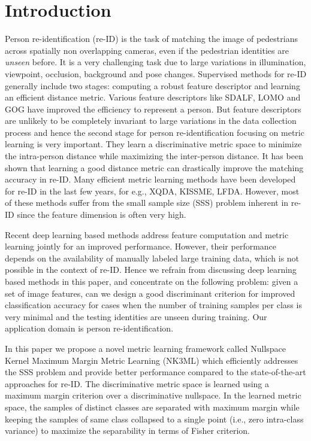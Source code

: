 \documentclass[runningheads]{llncs}
\begin{document}
\section{Introduction}
Person re-identification (re-ID) is the task of matching the image of pedestrians across spatially \color{black}non overlapping cameras, even if the pedestrian identities  are \textit{unseen} before. It is a very challenging task due to large variations in illumination, viewpoint, occlusion, background and pose changes. Supervised methods for re-ID generally include two stages: computing a robust feature descriptor and learning an efficient distance metric. Various feature descriptors like SDALF\cite{SDALF}, LOMO\cite{LOMO} and GOG\cite{GOG} have improved the efficiency to represent a person. But feature descriptors are unlikely to be completely invariant to large variations in the data collection process and hence the second stage for person re-identification focusing on metric learning is very important. They learn a discriminative metric space to minimize the intra-person distance while maximizing the inter-person distance. It has been shown that learning a good distance metric can drastically improve the matching accuracy in re-ID. Many efficient metric learning methods have been developed for re-ID in the last few years, for e.g., XQDA\cite{LOMO}, KISSME\cite{KISSME},  LFDA\cite{LFDA:CVPR}. However, most of these methods suffer from the small sample size (SSS) problem inherent in re-ID since the feature dimension is often very high.


Recent deep learning based methods address feature computation and metric learning jointly for an improved performance. However, their performance depends on the availability of manually labeled large training data, which is not possible in the context of re-ID. Hence we refrain from discussing deep learning based methods in this paper, and concentrate on the following problem: given a set of image features, can we design a good discriminant criterion for improved classification accuracy for cases when the number of training samples per class is very minimal and the testing identities are unseen during training. \color{black}Our application domain is person re-identification.

In this paper we propose a  novel metric learning framework called Nullspace Kernel Maximum Margin Metric Learning (NK3ML) which efficiently addresses the SSS problem and provide better performance compared to the state-of-the-art approaches for re-ID. The discriminative metric space is learned using a maximum margin criterion over a discriminative nullspace. In the learned metric space, the samples of distinct classes are separated with maximum margin while keeping the samples of same class collapsed to a single point (i.e., zero intra-class variance) to maximize the separability in terms of Fisher criterion.
\end{document}
